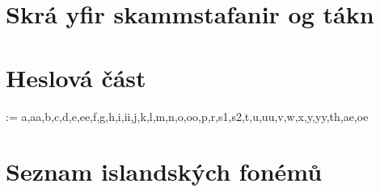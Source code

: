 \chapter{Skrá yfir skammstafanir og tákn}
\begin{multicols}{2}
\begin{description}[leftmargin=!,labelwidth=1.5cm]

\end{description}
\end{multicols}


\chapter{Heslová část}

\clearpage

\fi


\ifinputletters

\cleardoublepage

\dictionarygeometry
\pagestyle{myheadings}

\newcommand*{\alphabetF}{%
  a,aa,b,c,d,e,ee,f,g,h,i,ii,j,k,l,m,n,o,oo,p,r,s1,s2,t,u,uu,v,w,x,y,yy,th,ae,oe}
\ifPDFtest

\else
\makeatletter
\@for\next:=\alphabetF\do{}
\makeatother 
\fi
\restoregeometry
\pagestyle{plain}

\fi


\ifinputphon

\cleardoublepage

\chapter{Seznam islandských fonémů}              \label{sec:phon_phonems}


\clearpage


